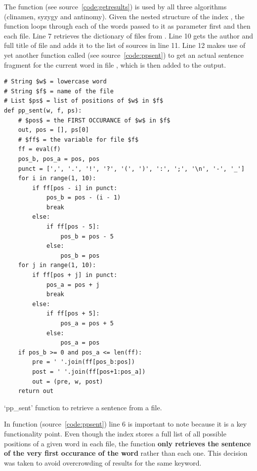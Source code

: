 The  function (see source~\ref{code:getresults}) is used by all three algorithms (clinamen, syzygy and antinomy). Given the nested structure of the index , the function loops through each of the words passed to it as parameter  first and then each file. Line \num{7} retrieves the dictionary of files from . Line \num{10} gets the author and full title of file  and adds it to the list of sources in line 11. Line \num{12} makes use of yet another function called  (see source~\ref{code:ppsent}) to get an actual sentence fragment for the current word  in file , which is then added to the output.

\begin{listing}
  \begin{verbatim}
# String $w$ = lowercase word
# String $f$ = name of the file
# List $ps$ = list of positions of $w$ in $f$
def pp_sent(w, f, ps):
    # $pos$ = the FIRST OCCURANCE of $w$ in $f$
    out, pos = [], ps[0]
    # $ff$ = the variable for file $f$
    ff = eval(f)
    pos_b, pos_a = pos, pos
    punct = [',', '.', '!', '?', '(', ')', ':', ';', '\n', '-', '_']
    for i in range(1, 10):
        if ff[pos - i] in punct:
            pos_b = pos - (i - 1)
            break
        else:
            if ff[pos - 5]:
                pos_b = pos - 5
            else:
                pos_b = pos
    for j in range(1, 10):
        if ff[pos + j] in punct:
            pos_a = pos + j
            break
        else:
            if ff[pos + 5]:
                pos_a = pos + 5
            else:
                pos_a = pos
    if pos_b >= 0 and pos_a <= len(ff):
        pre = ' '.join(ff[pos_b:pos])
        post = ' '.join(ff[pos+1:pos_a])
        out = (pre, w, post)
    return out
  \end{verbatim}
\caption{`pp\_sent' function to retrieve a sentence from a file.}
\label{code:ppsent}
\end{listing}

In function  (source~\ref{code:ppsent}) line \num{6} is important to note because it is a key functionality point. Even though the index  stores a full list of all possible positions of a given word in each file, the  function \textbf{only retrieves the sentence of the very first occurance of the word} rather than each one. This decision was taken to avoid overcrowding of results for the same keyword.

